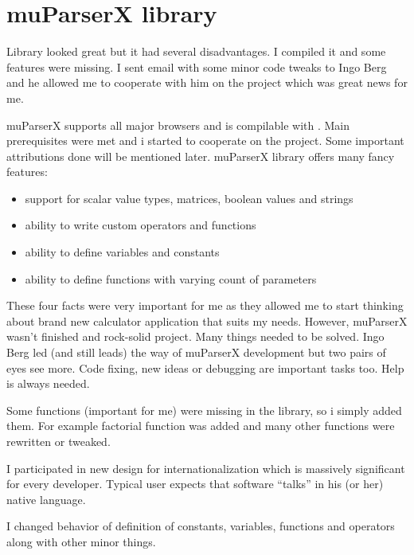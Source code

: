 \chapter{muParserX library}
Library looked great but it had several disadvantages. I compiled it and some features were missing. I sent email with some minor code tweaks to Ingo Berg and he allowed me to cooperate with him on the project which was great news for me.

muParserX supports all major browsers and is compilable with . Main prerequisites were met and i started to cooperate on the project. Some important attributions done will be mentioned later. muParserX library offers many fancy features:
\begin{itemize}
\item support for scalar value types, matrices, boolean values and strings
\item ability to write custom operators and functions
\item ability to define variables and constants
\item ability to define functions with varying count of parameters
\end{itemize}

These four facts were very important for me as they allowed me to start thinking about brand new calculator application that suits my needs. However, muParserX wasn't finished and rock-solid project. Many things needed to be solved. Ingo Berg led (and still leads) the way of muParserX development but two pairs of eyes see more. Code fixing, new ideas or debugging are important tasks too. Help is always needed.

Some functions (important for me) were missing in the library, so i simply added them. For example factorial function was added	and many other functions were rewritten or tweaked.

I participated in new design for internationalization which is massively significant for every developer. Typical user expects that software \enquote{talks} in his (or her) native language.

I changed behavior of definition of constants, variables, functions and operators along with other minor things.


